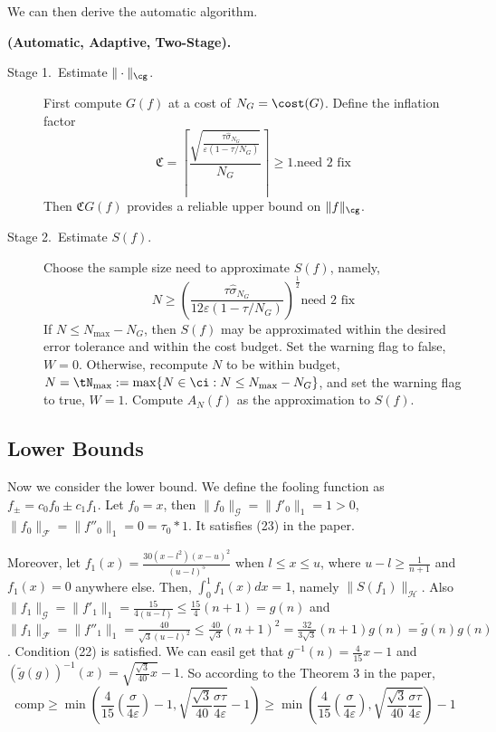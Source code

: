 We can then derive the automatic algorithm.
\begin{algo} \label{twostagedetalgo} {\bf (Automatic, Adaptive, Two-Stage).} 

\begin{description}

\item[Stage 1.\ Estimate {$\|\cdot\|_{\cg}$}.] First compute $G(f)$ at a cost of $N_{G} = \cost(G)$.   Define the inflation factor
\begin{equation}\label{norminflate}
\mathfrak{C} =\left\lceil\frac{\sqrt{\frac{\tau \hat{\sigma}_{N_G}}{\varepsilon(1 - \tau/ N_G)}}}{N_{G}}\right\rceil \ge 1. \text{need 2 fix}
\end{equation}
Then $\mathfrak{C} G(f)$ provides a reliable upper bound on $\|f\|_{\cg}$.

\item [Stage 2.\ Estimate {$S(f)$}.] Choose the sample size need to approximate $S(f)$, namely,
\[
N \geq \left(\frac{\tau \hat{\sigma}_{N_G}}{12\varepsilon(1-\tau/N_G)}\right)^{\frac{1}{2}} \text{need 2 fix}
\]
If $N \le N_{\max}-N_G$, then $S(f)$ may be approximated within the desired error tolerance and within the cost budget.  Set the warning flag to false, $W=0$. Otherwise, recompute $N$ to be within budget, $N = \tN_{\max} := \max\{N \in \ci : N\le N_{\max} -  N_G\}$, and set the warning flag to true, $W=1$.  Compute $A_N(f)$ as the approximation to $S(f)$.
\end{description}
\end{algo}


\subsection{Lower Bounds}
Now we consider the lower bound. We define the fooling function as $f_{\pm}=c_0f_0\pm c_1f_1$. Let $f_0=x$, then $\|f_0\|_{\mathcal{G}}=\|f'_0\|_1=1>0$, $\|f_0\|_{\mathcal{F}}=\|f''_0\|_1=0=\tau_0*1$. It satisfies (23) in the paper.

Moreover, let $f_1(x)=\frac{30(x-l^2)(x-u)^2}{(u-l)^5}$ when $l \leq x \leq u$, where $u-l\geq\frac{1}{n+1}$ and $f_1(x)=0$ anywhere else. Then, $\int_{0}^{1}f_1(x)dx=1$, namely $\|S(f_1)\|_{\mathcal{H}}$. Also $\|f_1\|_{\mathcal{G}}=\|f'_{1}\|_1=\frac{15}{4(u-l)}\leq \frac{15}{4}(n+1)=g(n)$ and $\|f_1\|_{\mathcal{F}}=\|f''_{1}\|_1=\frac{40}{\sqrt{3}(u-l)^2}\leq \frac{40}{\sqrt{3}}(n+1)^2=\frac{32}{3\sqrt{3}}(n+1)g(n)=\tilde{g}(n)g(n)$. Condition (22) is satisfied. We can easil get that $g^{-1}(n)=\frac{4}{15}x-1$ and $(\tilde{g}(g))^{-1}(x)=\sqrt{\frac{\sqrt{3}}{40}x}-1$. So according to the Theorem 3 in the paper, $$\text{comp}\geq \min\left(\frac{4}{15}(\frac{\sigma}{4\varepsilon})-1,\sqrt{\frac{\sqrt{3}}{40}\frac{\sigma\tau}{4\varepsilon}}-1\right)\geq\min\left(\frac{4}{15}(\frac{\sigma}{4\varepsilon}),\sqrt{\frac{\sqrt{3}}{40}\frac{\sigma\tau}{4\varepsilon}}\right)-1$$


